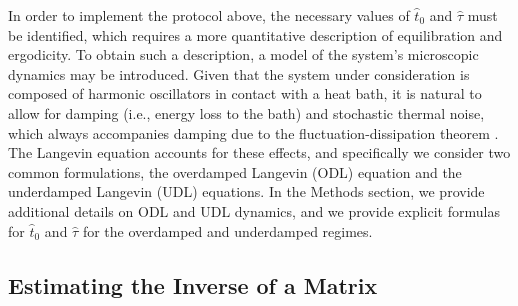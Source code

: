 \documentclass[prx,onecolumn,floatfix,longbibliography,notitlepage, nofootinbib,12pt]{revtex4-2}
\begin{document}
In order to implement the protocol above, the necessary values of $\widehat{t}_0$ and $\widehat{\tau}$ must be identified, which requires a more quantitative description of equilibration and ergodicity. To obtain such a description, a model of the system's microscopic dynamics may be introduced. Given that the system under consideration is composed of harmonic oscillators in contact with a heat bath, it is natural to allow for damping (i.e., energy loss to the bath) and stochastic thermal noise, which always accompanies damping due to the fluctuation-dissipation theorem \cite{kubo1966fluctuation, weber1956fluctuation}. The Langevin equation accounts for these effects, and specifically we consider two common formulations, the overdamped Langevin (ODL) equation  and the underdamped Langevin (UDL) equations. In the Methods section, we provide additional details on ODL and UDL dynamics, and we provide explicit formulas for $\widehat{t}_0$ and $\widehat{\tau}$ for the overdamped and underdamped regimes.






\subsection{Estimating the Inverse of a Matrix}
\end{document}
